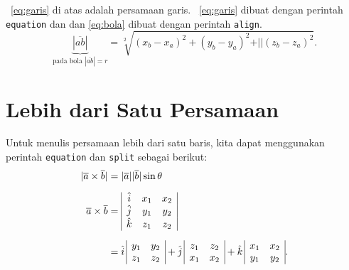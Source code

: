 \equ~\eqref{eq:garis} di atas adalah persamaan garis. 
\equ~\eqref{eq:garis} dibuat dengan perintah \bslash \texttt{equation}
dan dan \eqref{eq:bola} dibuat dengan perintah \bslash \texttt{align}. 
\begin{equation}\label{eq:bola}
	\underbrace{|\overline{ab}|}_{\text{pada bola $|\overline{ab}| = r$}} 
		= \sqrt[2]{(x_{b} - x_{a})^{2} + (y_{b} - y_{a})^{2} + 
				\vert\vert(z_{b} - z_{a})^{2}}.
\end{equation}

\section{Lebih dari Satu Persamaan}
\label{sec:multiEqu}
Untuk menulis persamaan lebih dari satu baris, kita dapat menggunakan perintah \bslash \texttt{equation} 
dan \bslash \texttt{split} sebagai berikut:
\begin{equation}\label{eq:matriks1}	
\begin{split}
	|\overline{a} \times \overline{b}| &= |\overline{a}| |\overline{b}| \sin\theta 
		\\[0.2cm]
	\overline{a} \times \overline{b} &=  
		\begin{array}{| c c c |}
			\hat{i} & x_{1} & x_{2} \\
			\hat{j} & y_{1} & y_{2} \\
			\hat{k} & z_{1} & z_{2} \\
		\end{array}  \\[0.2cm]
	&= \hat{i} \,
		\begin{array}{ | c c | }
			y_{1} & y_{2} \\
			z_{1} & z_{2} \\
		\end{array} 
	   + \hat{j} \,
		\begin{array}{ | c c | }
			z_{1} & z_{2} \\
			x_{1} & x_{2} \\
		\end{array} 
	   + \hat{k} \,	
		\begin{array}{ | c c | }
			x_{1} & x_{2} \\
			y_{1} & y_{2} \\
		\end{array}.
\end{split}
\end{equation}

